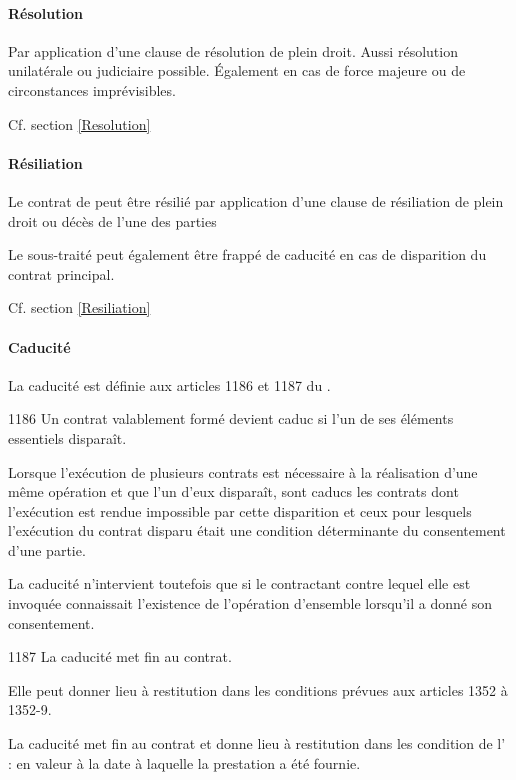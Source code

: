 	\paragraph{Résolution} Par application d’une clause de résolution de plein droit. Aussi résolution unilatérale ou judiciaire possible. Également en cas de force majeure ou de circonstances imprévisibles.


	Cf. section \ref{Resolution}

	\paragraph{Résiliation} Le contrat de \ST* peut être résilié par application d’une clause de résiliation de plein droit ou décès de l’une des parties

	Le sous-traité peut également être frappé de caducité en cas de disparition du contrat principal.


	Cf. section \ref{Resiliation}

	\paragraph{Caducité} La caducité est définie aux articles 1186 et 1187 du \cciv.

	\begin{citationArticle}{1186}{\cciv}
		Un contrat valablement formé devient caduc si l'un de ses éléments essentiels disparaît.

		Lorsque l'exécution de plusieurs contrats est nécessaire à la réalisation d'une même opération et que l'un d'eux disparaît, sont caducs les contrats dont l'exécution est rendue impossible par cette disparition et ceux pour lesquels l'exécution du contrat disparu était une condition déterminante du consentement d'une partie.

		La caducité n'intervient toutefois que si le contractant contre lequel elle est invoquée connaissait l'existence de l'opération d'ensemble lorsqu'il a donné son consentement.
	\end{citationArticle}

	\begin{citationArticle}{1187}{\cciv}
		La caducité met fin au contrat.

		Elle peut donner lieu à restitution dans les conditions prévues aux articles 1352 à 1352-9.
	\end{citationArticle}

	La caducité met fin au contrat et donne lieu à restitution dans les condition de l' : en valeur à la date à laquelle la prestation a été fournie.



